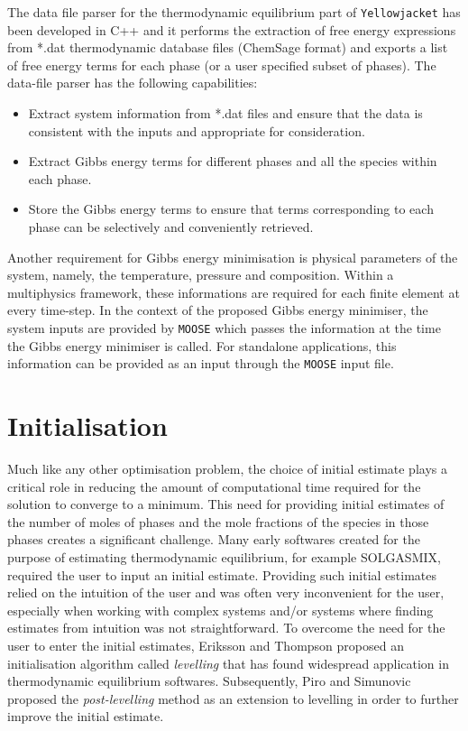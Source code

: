 	The data file parser for the thermodynamic equilibrium part of \texttt{Yellowjacket} has been developed in C++ and it performs the extraction of free energy expressions from *.dat thermodynamic database files (ChemSage format) and exports a list of free energy terms for each phase (or a user specified subset of phases). The data-file parser has the following capabilities:
\begin{itemize}
\itemsep-0.5em
    \item Extract system information from *.dat files and ensure that the data is consistent with the inputs and appropriate for consideration.
    \item Extract Gibbs energy terms for different phases and all the species within each phase.
    \item Store the Gibbs energy terms to ensure that terms corresponding to each phase can be selectively and conveniently retrieved.
\end{itemize}

	Another requirement for Gibbs energy minimisation is physical parameters of the system, namely, the temperature, pressure and composition. Within a multiphysics framework, these informations are required for each finite element at every time-step. In the context of the proposed Gibbs energy minimiser, the system inputs are provided by \texttt{MOOSE} which passes the information at the time the Gibbs energy minimiser is called. For standalone applications, this information can be provided as an input through the \texttt{MOOSE} input file.
	
\section{Initialisation}
	Much like any other optimisation problem, the choice of initial estimate plays a critical role in reducing the amount of computational time required for the solution to converge to a minimum. This need for providing initial estimates of the number of moles of phases and the mole fractions of the species in those phases creates a significant challenge. Many early softwares  created for the purpose of estimating thermodynamic equilibrium, for example SOLGASMIX, required the user to input an initial estimate. Providing such initial estimates relied on the intuition of the user and was often very inconvenient for the user, especially when working with complex systems and/or systems where finding estimates from intuition was not straightforward.
	To overcome the need for the user to enter the initial estimates,  Eriksson and Thompson \cite{Eriksson89} proposed an initialisation algorithm called \textit{levelling} that has found widespread application in thermodynamic equilibrium softwares. Subsequently, Piro and Simunovic \cite{Piro12a} proposed the \textit{post-levelling} method as an extension to levelling in order to further improve the initial estimate.
	
